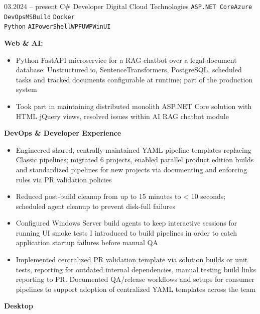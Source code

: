 \documentclass[9pt]{developercv} %
\begin{document}
\begin{entrylist}
	\entry
		{03.2024 -- present}
		{C\# Developer}
		{Digital Cloud Technologies}
		{\texttt{ASP.NET Core}\slashsep\texttt{Azure DevOps}\slashsep\texttt{MSBuild}
		\slashsep\texttt{Docker}\slashsep\\\texttt{Python}
		\slashsep\texttt{AI}\slashsep\texttt{PowerShell}\slashsep\texttt{WPF}\slashsep\texttt{UWP}\slashsep\texttt{WinUI}}
		{}
		{
			{\bf{Web \& AI:}}

			\begin{itemize}
				\item Python FastAPI microservice for a RAG chatbot over a legal-document database: Unstructured.io, SentenceTransformers, PostgreSQL, scheduled tasks and tracked documents configurable at runtime; part of the production system
				\item Took part in maintaining distributed monolith ASP.NET Core solution with HTML jQuery views, resolved issues within AI RAG chatbot module 
			\end{itemize}
			
			{\bf{DevOps \& Developer Experience}}
			\begin{itemize}
				\item Engineered shared, centrally maintained YAML pipeline templates replacing Classic pipelines; migrated 6 projects, enabled parallel product edition builds and standardized pipelines for new projects via documenting and enforcing rules via PR validation policies
				\item Reduced post-build cleanup from up to 15 minutes to < 10 seconds; scheduled agent cleanup to prevent disk-full failures
				\item Configured Windows Server build agents to keep interactive sessions for running UI smoke tests I introduced to build pipelines in order to catch application startup failures before manual QA
				\item Implemented centralized PR validation template via solution builds or unit tests, reporting for outdated internal dependencies, manual testing build links reporting to PR. Documented QA/release workflows and setups for consumer pipelines to support adoption of centralized YAML templates across the team
			\end{itemize}

			{\bf{Desktop}}

}
\end{entrylist}
\end{document}
